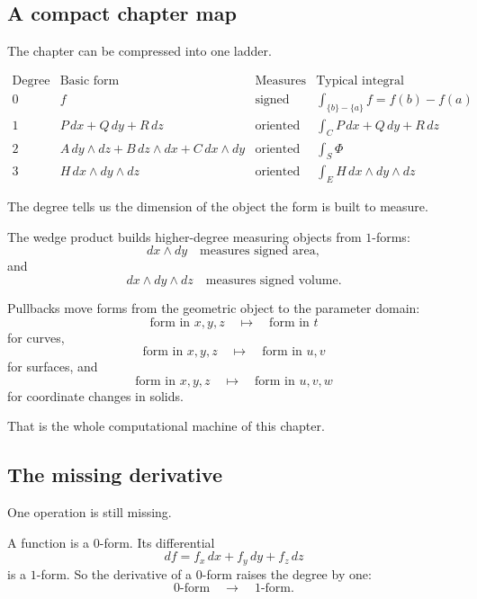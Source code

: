 \subsection{A compact chapter map}

The chapter can be compressed into one ladder.

\[
\begin{array}{c|c|c|c}
\text{Degree} & \text{Basic form} & \text{Measures} & \text{Typical integral} \\ \hline
0 & f & \text{signed points} &
\displaystyle \int_{\{b\}-\{a\}}f=f(b)-f(a)\\[4mm]
1 & P\,dx+Q\,dy+R\,dz & \text{oriented tangent vectors} &
\displaystyle \int_C P\,dx+Q\,dy+R\,dz\\[4mm]
2 & A\,dy\wedge dz+B\,dz\wedge dx+C\,dx\wedge dy
& \text{oriented surface pieces} &
\displaystyle \int_S \Phi\\[4mm]
3 & H\,dx\wedge dy\wedge dz & \text{oriented volume pieces} &
\displaystyle \int_E H\,dx\wedge dy\wedge dz
\end{array}
\]

The degree tells us the dimension of the object the form is built to measure.

The wedge product builds higher-degree measuring objects from \(1\)-forms:
\[
    dx\wedge dy
    \quad\text{measures signed area},
\]
and
\[
    dx\wedge dy\wedge dz
    \quad\text{measures signed volume}.
\]

Pullbacks move forms from the geometric object to the parameter domain:
\[
    \text{form in }x,y,z
    \quad\longmapsto\quad
    \text{form in }t
\]
for curves,
\[
    \text{form in }x,y,z
    \quad\longmapsto\quad
    \text{form in }u,v
\]
for surfaces, and
\[
    \text{form in }x,y,z
    \quad\longmapsto\quad
    \text{form in }u,v,w
\]
for coordinate changes in solids.

That is the whole computational machine of this chapter.

\subsection{The missing derivative}

One operation is still missing.

A function is a \(0\)-form.  Its differential
\[
    df=f_x\,dx+f_y\,dy+f_z\,dz
\]
is a \(1\)-form.  So the derivative of a \(0\)-form raises the degree by one:
\[
    0\text{-form}
    \quad\longrightarrow\quad
    1\text{-form}.
\]

